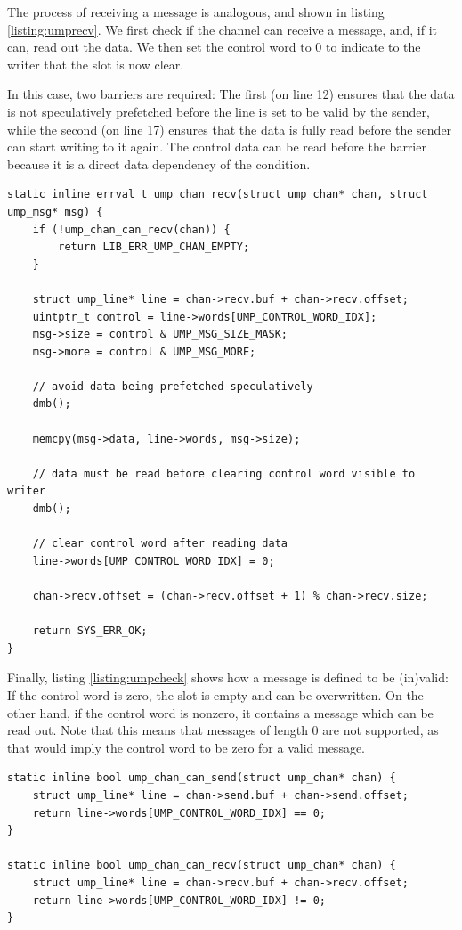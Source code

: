 The process of receiving a message is analogous, and shown in listing \ref{listing:umprecv}. We first check if the channel can receive a message, and, if it can, read out the data. We then set the control word to 0 to indicate to the writer that the slot is now clear.

In this case, two barriers are required: The first (on line 12) ensures that the data is not speculatively prefetched before the line is set to be valid by the sender, while the second (on line 17) ensures that the data is fully read before the sender can start writing to it again.
The control data can be read before the barrier because it is a direct data dependency of the condition.

\begin{lstlisting}[caption={Receiving a UMP message},label={listing:umprecv}]
static inline errval_t ump_chan_recv(struct ump_chan* chan, struct ump_msg* msg) {
    if (!ump_chan_can_recv(chan)) {
        return LIB_ERR_UMP_CHAN_EMPTY;
    }

    struct ump_line* line = chan->recv.buf + chan->recv.offset;
    uintptr_t control = line->words[UMP_CONTROL_WORD_IDX];
    msg->size = control & UMP_MSG_SIZE_MASK;
    msg->more = control & UMP_MSG_MORE;

    // avoid data being prefetched speculatively
    dmb();

    memcpy(msg->data, line->words, msg->size);

    // data must be read before clearing control word visible to writer
    dmb();

    // clear control word after reading data
    line->words[UMP_CONTROL_WORD_IDX] = 0;

    chan->recv.offset = (chan->recv.offset + 1) % chan->recv.size;

    return SYS_ERR_OK;
}
\end{lstlisting}

Finally, listing \ref{listing:umpcheck} shows how a message is defined to be (in)valid: If the control word is zero, the slot is empty and can be overwritten. On the other hand, if the control word is nonzero, it contains a message which can be read out. Note that this means that messages of length 0 are not supported, as that would imply the control word to be  zero for a valid message.
\begin{lstlisting}[caption={Checking if an entry is (in)valid},label={listing:umpcheck}]
static inline bool ump_chan_can_send(struct ump_chan* chan) {
    struct ump_line* line = chan->send.buf + chan->send.offset;
    return line->words[UMP_CONTROL_WORD_IDX] == 0;
}

static inline bool ump_chan_can_recv(struct ump_chan* chan) {
    struct ump_line* line = chan->recv.buf + chan->recv.offset;
    return line->words[UMP_CONTROL_WORD_IDX] != 0;
}
\end{lstlisting}

